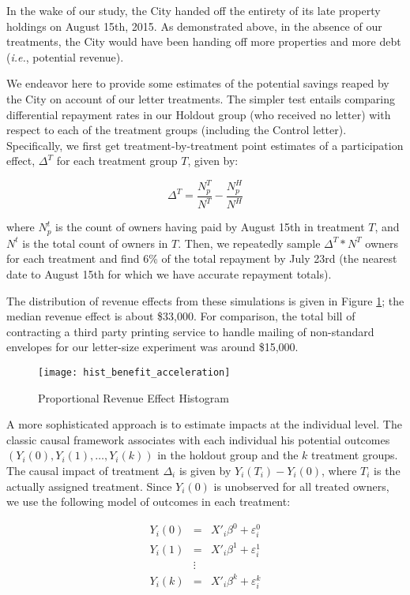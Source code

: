 \documentclass[12pt,titlepage]{article}
\begin{document}
In the wake of our study, the City handed off the entirety of its late 
property holdings on August 15th, 2015. As demonstrated above, in the
absence of our treatments, the City would have been handing off more
properties and more debt (\textit{i.e.}, potential revenue).

We endeavor here to provide some estimates of the potential savings
reaped by the City on account of our letter treatments. The simpler test
entails comparing differential repayment rates in our Holdout group
(who received no letter) with respect to each of the treatment groups 
(including the Control letter). Specifically, we first get 
treatment-by-treatment point estimates of a participation effect,
$\Delta^T$ for each treatment group $T$, given by:

\[
\Delta^T = \frac{N^T_p}{N^T} - \frac{N^H_p}{N^H}
\]

where $N^t_p$ is the count of owners having paid by August 15th in
treatment $T$, and $N^t$ is the total count of owners in $T$. Then,
we repeatedly sample $\Delta^T * N^T$ owners for each treatment and find
6\% of the total repayment by July 23rd (the nearest date to August
15th for which we have accurate repayment totals).

The distribution of revenue effects from these simulations is given
in Figure \ref{fig:rev_prop}; the median revenue effect is about
\$33,000. For comparison, the total bill of contracting a third party
printing service to handle mailing of non-standard envelopes for 
our letter-size experiment was around \$15,000.

\begin{figure}[htpb]
\begin{center}
\caption{Proportional Revenue Effect Histogram}
\label{fig:rev_prop}
\bigskip
\texttt{[image: hist\_benefit\_acceleration]}
\end{center}
\end{figure}

A more sophisticated approach is to estimate impacts at the individual 
level. The classic causal framework associates with each individual
his potential outcomes $(Y_i(0), Y_i(1), \ldots, Y_i(k))$ in the
holdout group and the $k$ treatment groups. The causal impact of
treatment $\Delta_i$ is given by $Y_i(T_i) - Y_i(0)$, where $T_i$
is the actually assigned treatment. Since $Y_i(0)$ is unobserved
for all treated owners, we use the following model of outcomes
in each treatment:

\begin{eqnarray*}
Y_i(0) & = & X'_i \beta^0 + \varepsilon_i^0\\
Y_i(1) & = & X'_i \beta^1 + \varepsilon_i^1\\
    & \vdots & \\
Y_i(k) & = & X'_i \beta^k + \varepsilon_i^k\\
\end{eqnarray*}
\end{document}
